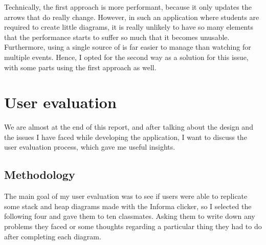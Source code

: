 \documentclass[]{usiinfbachelorproject}
\begin{document}
\noindent Technically, the first approach is more performant, because it only updates the arrows that do really change. However, in such an application where students are required to create little diagrams, it is really unlikely to have so many elements that the performance starts to suffer so much that it becomes unusable. Furthermore, using a single source of is far easier to manage than watching for multiple events. Hence, I opted for the second way as a solution for this issue, with some parts using the first approach as well.


\vspace{\fill}

\pagebreak

\section{User evaluation} \label{Testing}


We are almost at the end of this report, and after talking about the design and the issues I have faced while developing the application, I want to discuss the user evaluation process, which gave me useful insights.

\subsection{Methodology}

The main goal of my user evaluation was to see if users were able to replicate some stack and heap diagrams made with the Informa clicker, so I selected the following four and gave them to ten classmates. Asking them to write down any problems they faced or some thoughts regarding a particular thing they had to do after completing each diagram.

\end{document}

